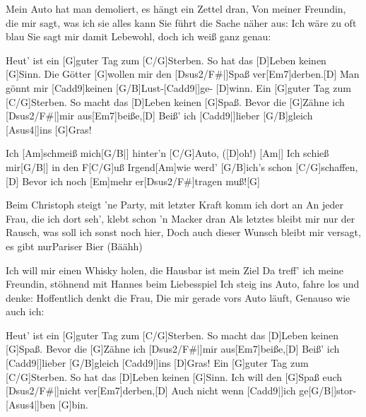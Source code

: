 \begin{guitar}
	Mein Auto hat man demoliert, es hängt ein Zettel dran,
	Von meiner Freundin, die mir sagt, was ich sie alles kann
	Sie führt die Sache näher aus: Ich wäre zu oft blau
	Sie sagt mir damit Lebewohl, doch ich weiß ganz genau:
	
	\begin{highlightbar}
		Heut' ist ein [G]guter Tag zum [C/G]Sterben.
		So hat das [D]Leben keinen [G]Sinn.
		Die Götter [G]wollen mir den [Dsus2/F#|]{Spaß} ver[Em7]derben.[D]{}
		Man gönnt mir [Cadd9]keinen [G/B]Lust-[Cadd9|]{ge-} [D]winn.
		Ein [G]guter Tag zum [C/G]Sterben.
		So macht das [D]Leben keinen [G]Spaß.
		Bevor die [G]Zähne ich [Dsus2/F#|]{mir }aus[Em7]beiße,[D]{}
		Beiß' ich [Cadd9|]{lieber} [G/B]gleich [Asus4|]{ins} [G]Gras!
	\end{highlightbar}
	
	\songsection{Bridge}
	Ich [Am]schmeiß mich[G/B|] hinter'n [C/G]Auto, ([D]oh!)
	[Am|] Ich schieß mir[G/B|] in den F[C/G]uß
	Irgend[Am]wie werd' [G/B]ich's schon [C/G]schaffen,[D]{}
	Bevor ich noch [Em]mehr er[Dsus2/F#]tragen muß![G]{}
	
	\songsection{Strophe 3}
	Beim Christoph steigt 'ne Party, mit letzter Kraft komm ich dort an
	An jeder Frau, die ich dort seh', klebt schon 'n Macker dran
	Als letztes bleibt mir nur der Rausch, was soll ich sonst noch hier,
	Doch auch dieser Wunsch bleibt mir versagt, es gibt nurPariser Bier (Bäähh)
	
	Ich will mir einen Whisky holen, die Hausbar ist mein Ziel
	Da treff' ich meine Freundin, stöhnend mit Hannes beim Liebesspiel
	Ich steig ins Auto, fahre los und denke: Hoffentlich denkt die Frau,
	Die mir gerade vors Auto läuft, Genauso wie auch ich:
	
	\begin{highlightbar}
		\songsection{Refrain}
		Heut' ist ein [G]guter Tag zum [C/G]Sterben.
		So macht das [D]Leben keinen [G]Spaß.
		Bevor die [G]Zähne ich [Dsus2/F#|]{mir }aus[Em7]beiße,[D]{}
		Beiß' ich [Cadd9|]{lieber} [G/B]gleich [Cadd9|]{ins} [D]Gras!
		Ein [G]guter Tag zum [C/G]Sterben.
		So hat das [D]Leben keinen [G]Sinn.
		Ich will den [G]Spaß euch [Dsus2/F#|]{nicht} ver[Em7]derben,[D]{}
		Auch nicht wenn [Cadd9|]{ich} ge[G/B|]{stor-} [Asus4|]{ben} [G]bin.
	\end{highlightbar}
\end{guitar}
